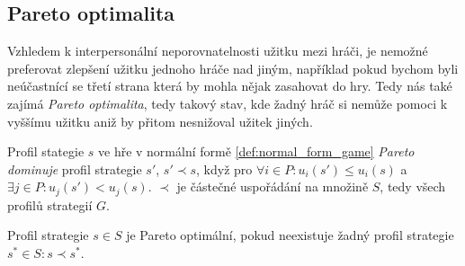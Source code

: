 \subsection{Pareto optimalita}
Vzhledem k interpersonální neporovnatelnosti užitku mezi hráči, je nemožné preferovat zlepšení užitku jednoho hráče nad jiným, například pokud bychom byli neúčastnící se třetí strana která by mohla nějak zasahovat do hry. 
Tedy nás také zajímá \textit{Pareto optimalita}, tedy takový stav, kde žadný hráč si nemůže pomoci k vyššímu užitku aniž by přitom nesnižoval užitek jiných. 
\begin{definition}
\label{def:pareto_dominates}
Profil stategie $s$ ve hře v normální formě \ref{def:normal_form_game} \textit{Pareto dominuje} profil strategie $s'$, $s' \prec s$, když pro $\forall i \in P: u_i(s') \leq u_i(s)$ a $\exists j\in P: u_j(s') < u_j(s)$. 
$\prec$ je částečné uspořádání na množině $S$, tedy všech profilů strategií $G$. 
\end{definition}
\begin{definition}
\label{def:pareto_optimal}
Profil strategie $s \in S$ je Pareto optimální, pokud neexistuje žadný profil strategie $s^* \in S: s \prec s^*$.
\end{definition}
